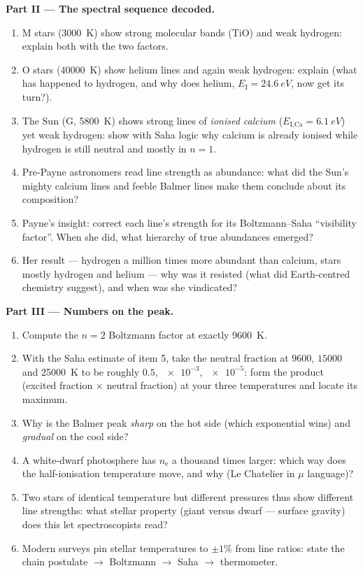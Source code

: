 \begin{problem}
\medskip\noindent\textbf{Part II --- The spectral sequence
decoded.}
\begin{enumerate}[resume]
  \item M stars (\qty{3000}{K}) show strong molecular bands (TiO)
        and weak hydrogen: explain both with the two factors.
  \item O stars (\qty{40000}{K}) show helium lines and again weak
        hydrogen: explain (what has happened to hydrogen, and why
        does helium, $E_{\text{I}} = \qty{24.6}{eV}$, now get its
        turn?).
  \item The Sun (G, \qty{5800}{K}) shows strong lines of
        \emph{ionised calcium} ($E_{\text{I,Ca}} = \qty{6.1}{eV}$)
        yet weak hydrogen: show with Saha logic why calcium is
        already ionised while hydrogen is still neutral and mostly
        in $n = 1$.
  \item Pre-Payne astronomers read line strength as abundance:
        what did the Sun's mighty calcium lines and feeble Balmer
        lines make them conclude about its composition?
  \item Payne's insight: correct each line's strength for its
        Boltzmann--Saha ``visibility factor''. When she did, what
        hierarchy of true abundances emerged?
  \item Her result --- hydrogen a million times more abundant
        than calcium, stars mostly hydrogen and helium --- why
        was it resisted (what did Earth-centred chemistry
        suggest), and when was she vindicated?
\end{enumerate}

\medskip\noindent\textbf{Part III --- Numbers on the peak.}
\begin{enumerate}[resume]
  \item Compute the $n = 2$ Boltzmann factor at exactly
        \qty{9600}{K}.
  \item With the Saha estimate of item 5, take the neutral
        fraction at $9600$, $15000$ and \qty{25000}{K} to be
        roughly $0.5$, $\num{e-3}$, $\num{e-5}$: form the product
        (excited fraction $\times$ neutral fraction) at your three
        temperatures and locate its maximum.
  \item Why is the Balmer peak \emph{sharp} on the hot side
        (which exponential wins) and \emph{gradual} on the cool
        side?
  \item A white-dwarf photosphere has $n_{\text{e}}$ a thousand
        times larger: which way does the half-ionisation
        temperature move, and why (Le Chatelier in $\mu$
        language)?
  \item Two stars of identical temperature but different
        pressures thus show different line strengths: what
        stellar property (giant versus dwarf --- surface gravity)
        does this let spectroscopists read?
  \item Modern surveys pin stellar temperatures to $\pm1\%$ from
        line ratios: state the chain postulate $\to$ Boltzmann
        $\to$ Saha $\to$ thermometer.
\end{enumerate}


\end{problem}
